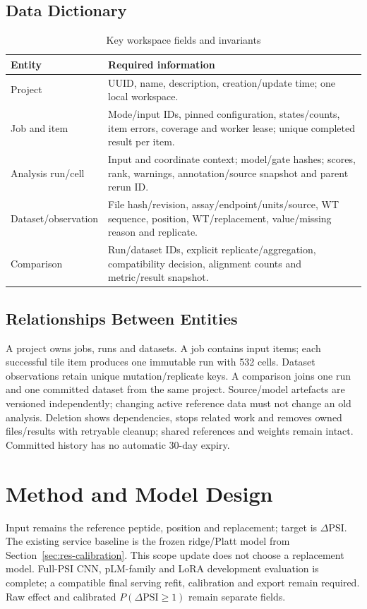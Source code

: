 \subsection{Data Dictionary}
\begin{table}[htbp]
  \centering
  \caption{Key workspace fields and invariants}\label{tab:workspace-fields}
  \small
  \begin{tabularx}{\textwidth}{|P{3.5cm}|X|}
    \hline \textbf{Entity} & \textbf{Required information} \\ \hline
    Project & UUID, name, description, creation/update time; one local workspace. \\ \hline
    Job and item & Mode/input IDs, pinned configuration, states/counts, item errors, coverage and worker lease; unique completed result per item. \\ \hline
    Analysis run/cell & Input and coordinate context; model/gate hashes; scores, rank, warnings, annotation/source snapshot and parent rerun ID. \\ \hline
    Dataset/observation & File hash/revision, assay/endpoint/units/source, WT sequence, position, WT/replacement, value/missing reason and replicate. \\ \hline
    Comparison & Run/dataset IDs, explicit replicate/aggregation, compatibility decision, alignment counts and metric/result snapshot. \\ \hline
  \end{tabularx}
\end{table}

\subsection{Relationships Between Entities}
A project owns jobs, runs and datasets. A job contains input items; each successful tile item produces
one immutable run with 532 cells. Dataset observations retain unique mutation/replicate keys.
A comparison joins one run and one committed dataset from the same project. Source/model artefacts
are versioned independently; changing active reference data must not change an old analysis.
Deletion shows dependencies, stops related work and removes owned files/results with retryable cleanup;
shared references and weights remain intact. Committed history has no automatic 30-day expiry.

\section{Method and Model Design}
Input remains the reference peptide, position and replacement; target is $\Delta$PSI. The existing
service baseline is the frozen ridge/Platt model from Section~\ref{sec:res-calibration}. This scope
update does not choose a replacement model. Full-PSI CNN, pLM-family and LoRA development
evaluation is complete; a compatible final serving refit, calibration and export remain required.
Raw effect and calibrated $P(\Delta\mathrm{PSI}\geq1)$ remain separate fields.

